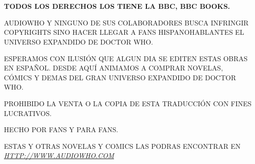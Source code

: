 \chapter*{}

\mbox{}

\vfill

\begin{center}

\textbf{TODOS LOS DERECHOS LOS TIENE LA BBC, BBC BOOKS.}

\vspace{2mm}

AUDIOWHO Y NINGUNO DE SUS COLABORADORES BUSCA INFRINGIR COPYRIGHTS SINO HACER LLEGAR A FANS HISPANOHABLANTES EL UNIVERSO EXPANDIDO DE DOCTOR WHO.

\vspace{2mm}

ESPERAMOS CON ILUSIÓN QUE ALGUN DIA SE EDITEN ESTAS OBRAS EN ESPAÑOL. DESDE AQUÍ ANIMAMOS A COMPRAR NOVELAS, CÓMICS Y DEMAS DEL GRAN UNIVERSO EXPANDIDO DE DOCTOR WHO.

\vspace{2mm}

PROHIBIDO LA VENTA O LA COPIA DE ESTA TRADUCCIÓN CON FINES LUCRATIVOS.

\vspace{2mm}

HECHO POR FANS Y PARA FANS.

\vspace{2mm}

ESTAS Y OTRAS NOVELAS Y COMICS LAS PODRAS ENCONTRAR EN  \href{http://www.audiowho.com}{\textit{HTTP://WWW.AUDIOWHO.COM}}
\end{center}